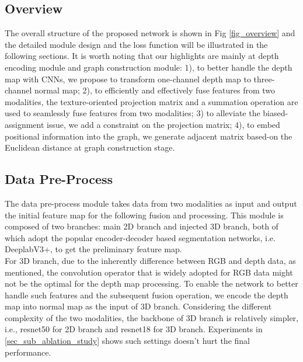 \documentclass[journal]{IEEEtran}
\begin{document}
\subsection{Overview}  \label{sec_sub_overview}
 
    The overall structure of the proposed network is shown in Fig \ref{fig_overview} and the detailed module design and the loss function will be illustrated in the following sections. It is worth noting that our highlights are mainly at depth encoding module and graph construction module: 1), to better handle the depth map with CNNs, we propose to transform one-channel depth map to three-channel normal map; 2), to efficiently and effectively fuse features from two modalities, the texture-oriented projection matrix and a summation operation are used to seamlessly fuse features from two modalities; 3) to alleviate the biased-assignment issue, we add a constraint on the projection matrix; 4), to embed positional information into the graph, we generate adjacent matrix based-on the Euclidean distance at graph construction stage. \\   

\subsection{Data Pre-Process}  \label{sec_sub_depth_process}
 
    The data pre-process module takes data from two modalities as input and output the initial feature map for the following fusion and processing. This module is composed of two branches: main 2D branch and injected 3D branch, both of which adopt the popular encoder-decoder based segmentation networks, i.e. DeeplabV3+, to get the preliminary feature map. \\   

     
    For 3D branch, due to the inherently difference between RGB and depth data, as \cite{2021shapeconv} mentioned, the convolution operator that is widely adopted for RGB data might not be the optimal for the depth map processing. To enable the network to better handle such features and the subsequent fusion operation, we encode the depth map into normal map as the input of 3D branch. Considering the different complexity of the two modalities, the backbone of 3D branch is relatively simpler, i.e., resnet50 for 2D branch and resnet18 for 3D branch. Experiments in \ref{sec_sub_ablation_study} shows such settings doesn't hurt the final performance. \\   
\end{document}
